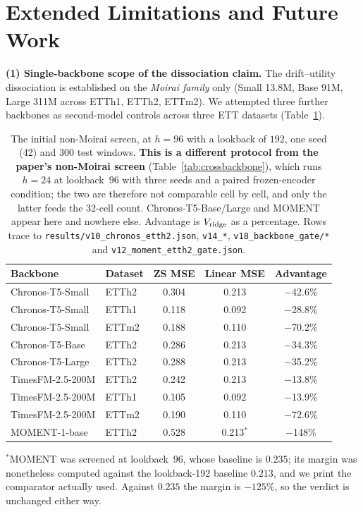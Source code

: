 \section{Extended Limitations and Future Work}
\label{app:limitations}

\textbf{(1) Single-backbone scope of the dissociation claim.}
The drift--utility dissociation is established on the \emph{Moirai
family} only (Small 13.8M, Base 91M, Large 311M across ETTh1, ETTh2,
ETTm2).  We attempted three further backbones as second-model
controls across three ETT datasets (Table~\ref{tab:backbone_screen}).

\begin{table}[!htbp]
\centering\small
\caption{The initial non-Moirai screen, at $h{=}96$ with a lookback of $192$, one
seed (42) and $300$ test windows. \textbf{This is a different protocol from the
paper's non-Moirai screen} (Table~\ref{tab:crossbackbone}), which runs $h{=}24$
at lookback~$96$ with three seeds and a paired frozen-encoder condition; the two
are therefore not comparable cell by cell, and only the latter feeds the 32-cell
count. Chronos-T5-Base/Large and MOMENT appear here and nowhere else. Advantage
is $V_{\text{ridge}}$ as a percentage. Rows trace to
\texttt{results/v10\_chronos\_etth2.json}, \texttt{v14\_*}, \texttt{v18\_backbone\_gate/*}
and \texttt{v12\_moment\_etth2\_gate.json}.}
\label{tab:backbone_screen}
\begin{tabular}{llccc}
\toprule
Backbone & Dataset & ZS MSE & Linear MSE & Advantage \\
\midrule
Chronos-T5-Small  & ETTh2 & 0.304 & 0.213 & $-$42.6\% \\
Chronos-T5-Small  & ETTh1 & 0.118 & 0.092 & $-$28.8\% \\
Chronos-T5-Small  & ETTm2 & 0.188 & 0.110 & $-$70.2\% \\
Chronos-T5-Base   & ETTh2 & 0.286 & 0.213 & $-$34.3\% \\
Chronos-T5-Large  & ETTh2 & 0.288 & 0.213 & $-$35.2\% \\
TimesFM-2.5-200M  & ETTh2 & 0.242 & 0.213 & $-$13.8\% \\
TimesFM-2.5-200M  & ETTh1 & 0.105 & 0.092 & $-$13.9\% \\
TimesFM-2.5-200M  & ETTm2 & 0.190 & 0.110 & $-$72.6\% \\
MOMENT-1-base     & ETTh2 & 0.528 & 0.213$^{*}$ & $-$148\%  \\
\bottomrule
\end{tabular}

\vspace{2pt}
{\footnotesize $^{*}$MOMENT was screened at lookback~$96$, whose baseline is
$0.235$; its margin was nonetheless computed against the lookback-192 baseline
$0.213$, and we print the comparator actually used. Against $0.235$ the margin is
$-125\%$, so the verdict is unchanged either way.}
\end{table}


